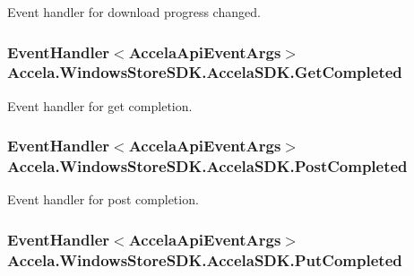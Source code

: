 Event handler for download progress changed. 

\hypertarget{class_accela_1_1_windows_store_s_d_k_1_1_accela_s_d_k_a592b561cd868b1bedef095647a9b1b93}{
\subsubsection[{Get\+Completed}]{\setlength{\rightskip}{0pt plus 5cm}Event\+Handler$<${\bf Accela\+Api\+Event\+Args}$>$ Accela.\+Windows\+Store\+S\+D\+K.\+Accela\+S\+D\+K.\+Get\+Completed}}\label{class_accela_1_1_windows_store_s_d_k_1_1_accela_s_d_k_a592b561cd868b1bedef095647a9b1b93}


Event handler for get completion. 

\hypertarget{class_accela_1_1_windows_store_s_d_k_1_1_accela_s_d_k_abb051213f540d79972279d61a9f69304}{
\subsubsection[{Post\+Completed}]{\setlength{\rightskip}{0pt plus 5cm}Event\+Handler$<${\bf Accela\+Api\+Event\+Args}$>$ Accela.\+Windows\+Store\+S\+D\+K.\+Accela\+S\+D\+K.\+Post\+Completed}}\label{class_accela_1_1_windows_store_s_d_k_1_1_accela_s_d_k_abb051213f540d79972279d61a9f69304}


Event handler for post completion. 

\hypertarget{class_accela_1_1_windows_store_s_d_k_1_1_accela_s_d_k_aed2d9e7a18c0e4dcb3cd1178883596eb}{
\subsubsection[{Put\+Completed}]{\setlength{\rightskip}{0pt plus 5cm}Event\+Handler$<${\bf Accela\+Api\+Event\+Args}$>$ Accela.\+Windows\+Store\+S\+D\+K.\+Accela\+S\+D\+K.\+Put\+Completed}}\label{class_accela_1_1_windows_store_s_d_k_1_1_accela_s_d_k_aed2d9e7a18c0e4dcb3cd1178883596eb}


